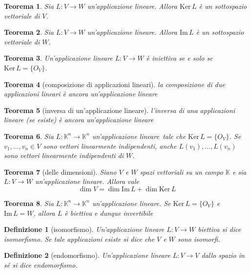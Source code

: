 \documentclass[9pt, a4paper]{article}
\newcommand{\K}{\mathbb{K}}
\newcommand{\letlin}{Sia $ L \colon \K^n \to \K^n $ un'applicazione lineare}
\newcommand{\Ker}{\mathrm{Ker}\,}
\newcommand{\Imm}{\mathrm{Im}\,}
\theoremstyle{mythm}
\newtheorem{definition}{Definizione}[section]
\newtheorem{thm}{Teorema}[section]
\begin{document}
\begin{thm}
	Sia $ L \colon V \to W  $ un'applicazione lineare. Allora $ \Ker L $ è un sottospazio vettoriale di $ V $.
\end{thm}

\begin{thm}
	Sia $ L \colon V \to W  $ un'applicazione lineare. Allora $ \Imm L $ è un sottospazio vettoriale di $ W $.
\end{thm}

\begin{thm}
	Un'applicazione lineare $ L \colon V \to W $ è iniettiva se e solo se $ \Ker L = \{O_V\} $.
\end{thm}

\begin{thm}[composizione di applicazioni lineari]
	\textsf{la composizione di due applicazioni lineari è ancora un'applicazione lineare}
\end{thm}

\begin{thm}[inversa di un'applicazione lineare]
	\textsf{l'inversa di una applicazioni lineare (se esiste) è ancora un'applicazione lineare}
\end{thm}

\begin{thm}
	\letlin \, tale che $ \Ker L = \{O_V\} $. Se $ v_1, \ldots, v_n \in V $ sono vettori linearmente indipendenti, anche $ L(v_1), \ldots, L(v_n) $ sono vettori linearmente indipendenti di $ W $.
\end{thm}

\begin{thm}[delle dimensioni]
	Siano $ V $ e $ W $ spazi vettoriali su un campo $ \K $ e sia $ L \colon V \to W $  un'applicazione lineare. Allora vale \[\dim V = \dim \Imm L + \dim \Ker L\]
\end{thm}

\begin{thm}
	\letlin. Se $ \Ker L = \{O_V\} $ e $ \Imm L = W $, allora $ L $ è biettiva e dunque invertibile
\end{thm}

\begin{definition}[isomorfismo]
	Un'applicazione lineare $ L \colon V \to W $ biettiva si dice isomorfismo. Se tale applicazioni esiste si dice che $ V $ e $ W $ sono isomorfi.
\end{definition}

\begin{definition}[endomorfismo]
	Un'applicazione lineare $ L \colon V \to V $ dallo spazio in sé si dice endomorfismo.
\end{definition}
\end{document}
